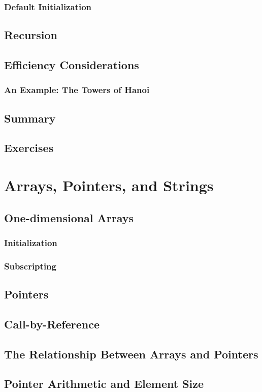 \documentclass[12pt]{book}
\begin{document}
\subsection{Default Initialization}
\section{Recursion}
\section{Efficiency Considerations}
\subsection{An Example: The Towers of Hanoi}
\section{Summary}
\section{Exercises}

\chapter{Arrays, Pointers, and Strings}

\section{One-dimensional Arrays}
\subsection{Initialization}
\subsection{Subscripting}
\section{Pointers}
\section{Call-by-Reference}
\section{The Relationship Between Arrays and Pointers}
\section{Pointer Arithmetic and Element Size}
\end{document}
